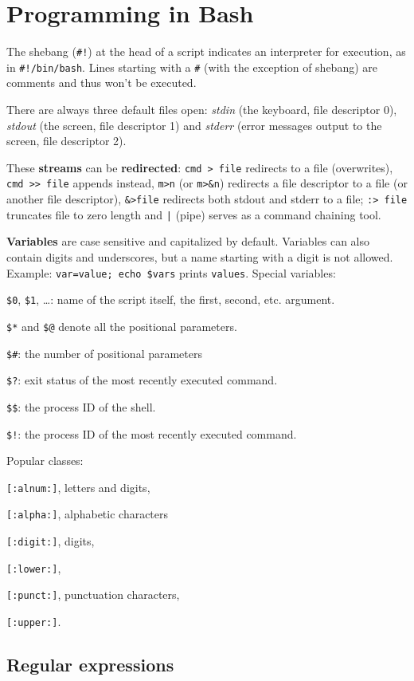 \section{Programming in Bash}
The shebang (\texttt{\#!}) at the head of a script indicates an 
interpreter for execution, as in \texttt{\#!/bin/bash}.
Lines starting with a \texttt{\#} (with the exception of shebang) 
are comments and thus won't be executed.


There are always three default files open:
\emph{stdin} (the keyboard, file descriptor 0),
\emph{stdout} (the screen, file descriptor 1) and
\emph{stderr} (error messages output to the screen, file descriptor 2).

These \textbf{streams} can be \textbf{redirected}: 
\texttt{cmd > file} redirects to a file (overwrites),
\texttt{cmd >{}> file} appends instead,
\texttt{m>n} (or \texttt{m>\&n}) redirects a file descriptor to a file 
(or another file descriptor), 
\texttt{\&>file} redirects both stdout and stderr to a file;
\texttt{:> file} truncates file to zero length and
\texttt{|} (pipe) serves as a command chaining tool.

\textbf{Variables} are case sensitive and capitalized by default.
Variables can also contain digits and underscores,
but a name starting with a digit is not allowed.
Example: \texttt{var=value; echo \${var}s} prints \texttt{values}.
Special variables:
\begin{enumx}
	\item \texttt{\$0}, \texttt{\$1}, \ldots: name of the script itself,
	the first, second, etc. argument.
	\item \texttt{\$*} and \texttt{\$@} denote all the positional parameters.
	\item \texttt{\$\#}: the number of positional parameters
	\item \texttt{\$?}: exit status of the most recently executed command.
	\item \texttt{\$\$}: the process ID of the shell.
	\item \texttt{\$!}: the process ID of the most recently executed command.
\end{enumx}


Popular classes:
\begin{enumx}
	\item \texttt{[:alnum:]}, letters and digits, 
	\item \texttt{[:alpha:]}, alphabetic characters
	\item \texttt{[:digit:]}, digits,
	\item \texttt{[:lower:]}, 
	\item \texttt{[:punct:]}, punctuation characters,
	\item \texttt{[:upper:]}.
\end{enumx}


\subsection{Regular expressions}

